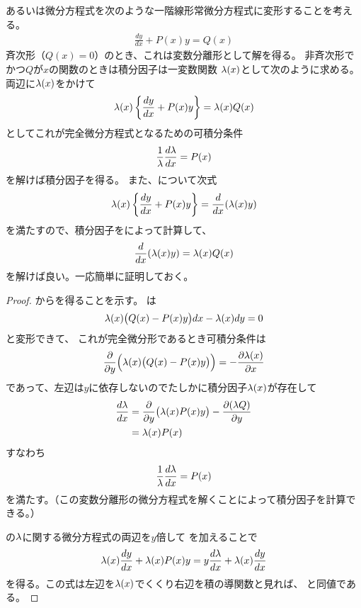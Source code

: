 あるいは微分方程式を次のような一階線形常微分方程式に変形することを考える。
\begin{gather}
  \frac{dy}{dx} + P(x)y = Q(x) \label{eq:appendix-IF-linearODE}
\end{gather}
斉次形（$Q(x) = 0$）のとき、これは変数分離形として解を得る。
非斉次形でかつ$Q$が$x$の関数のときは積分因子は一変数関数
${\lambda}(x)$として次のように求める。
両辺に${\lambda}(x)$をかけて
\begin{gather}
  {\lambda}(x)\left\{ \frac{dy}{dx} + P(x)y \right\} = {\lambda}(x)Q(x) \label{eq:appendix-IF-LODEgrl}
\end{gather}
としてこれが完全微分方程式となるための可積分条件
\begin{gather}
  \frac{1}{{\lambda}}\frac{d{\lambda}}{dx} = P(x) \label{eq:appendix-IF-linearODE-intcond}
\end{gather}
を解けば積分因子を得る。
また、について次式
\begin{gather}
  {\lambda}(x)\left\{ \frac{dy}{dx} + P(x)y \right\} = \frac{d}{dx}({\lambda}(x)y) \label{eq:appendix-IF-LHScond}
\end{gather}
を満たすので、積分因子をによって計算して、
\begin{gather}
  \frac{d}{dx}({\lambda}(x)y) = {\lambda}(x)Q(x)
\end{gather}
を解けば良い。一応簡単に証明しておく。

\begin{proof}
  からを得ることを示す。
  は
  \begin{gather}
    {\lambda}(x)\bigl(Q(x) - P(x)y\bigr)dx - {\lambda}(x)dy = 0
  \end{gather}
  と変形できて、
  これが完全微分形であるとき可積分条件は
  \begin{gather}
    \frac{\partial }{\partial y} \Bigl({\lambda}(x)\bigl(Q(x) - P(x)y\bigr)\Bigr) = - \frac{\partial {\lambda}(x)}{\partial x}
  \end{gather}
  であって、左辺は$y$に依存しないのでたしかに積分因子${\lambda}(x)$が存在して
  \begin{align}
    \frac{d{\lambda}}{dx}
    &= \frac{\partial }{\partial y}\bigl({\lambda}(x)P(x)y\bigr) - \frac{\partial ({\lambda} Q)}{\partial y} \\
    &= {\lambda}(x)P(x) \label{eq:appendix-IF-grlODE}
  \end{align}
  すなわち
  \begin{gather}
    \frac{1}{{\lambda}}\frac{d{\lambda}}{dx} = P(x) \label{eq:appendix-IF-howtogrl}
  \end{gather}
  を満たす。（この変数分離形の微分方程式を解くことによって積分因子を計算できる。）

  の${\lambda}$に関する微分方程式の両辺を$y$倍して
  を加えることで
  \begin{gather}
    {\lambda}(x)\frac{dy}{dx} + {\lambda}(x)P(x)y = y\frac{d{\lambda}}{dx} + {\lambda}(x)\frac{dy}{dx}
  \end{gather}
  を得る。この式は左辺を${\lambda}(x)$でくくり右辺を積の導関数と見れば、
  と同値である。
\end{proof}

